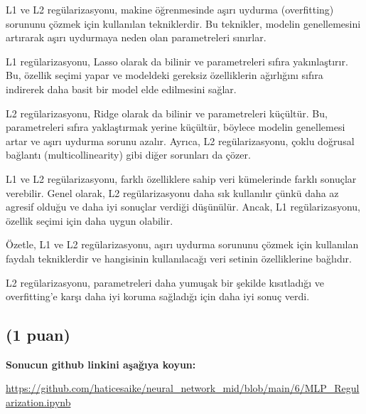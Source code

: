 \documentclass[11pt]{article}
\begin{document}
L1 ve L2 regülarizasyonu, makine öğrenmesinde aşırı uydurma (overfitting) sorununu çözmek için kullanılan tekniklerdir. Bu teknikler, modelin genellemesini artırarak aşırı uydurmaya neden olan parametreleri sınırlar.

L1 regülarizasyonu, Lasso olarak da bilinir ve parametreleri sıfıra yakınlaştırır. Bu, özellik seçimi yapar ve modeldeki gereksiz özelliklerin ağırlığını sıfıra indirerek daha basit bir model elde edilmesini sağlar.

L2 regülarizasyonu, Ridge olarak da bilinir ve parametreleri küçültür. Bu, parametreleri sıfıra yaklaştırmak yerine küçültür, böylece modelin genellemesi artar ve aşırı uydurma sorunu azalır. Ayrıca, L2 regülarizasyonu, çoklu doğrusal bağlantı (multicollinearity) gibi diğer sorunları da çözer.

L1 ve L2 regülarizasyonu, farklı özelliklere sahip veri kümelerinde farklı sonuçlar verebilir. Genel olarak, L2 regülarizasyonu daha sık kullanılır çünkü daha az agresif olduğu ve daha iyi sonuçlar verdiği düşünülür. Ancak, L1 regülarizasyonu, özellik seçimi için daha uygun olabilir.

Özetle, L1 ve L2 regülarizasyonu, aşırı uydurma sorununu çözmek için kullanılan faydalı tekniklerdir ve hangisinin kullanılacağı veri setinin özelliklerine bağlıdır.

L2 regülarizasyonu, parametreleri daha yumuşak bir şekilde kısıtladığı ve overfitting'e karşı daha iyi koruma sağladığı için daha iyi sonuç verdi.

\subsection{(1 puan)} \textbf{Sonucun github linkini  aşağıya koyun:}

\url{https://github.com/haticesaike/neural_network_mid/blob/main/6/MLP_Regularization.ipynb}
\end{document}
